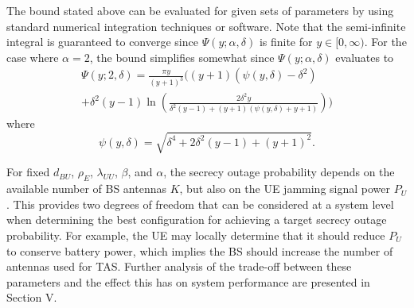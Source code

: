 \documentclass[10pt]{IEEEtran}
\begin{document}
The bound stated above can be evaluated for given sets of parameters by using standard numerical integration techniques or software.  Note that the semi-infinite integral is guaranteed to converge since $\Psi(y;\alpha,\delta)$ is finite for $y\in[0,\infty)$.  For the case where $\alpha = 2$, the bound simplifies somewhat since $\Psi(y;\alpha,\delta)$ evaluates to
\begin{multline}
  \Psi(y;2,\delta) = \frac{\pi  y }{(y+1)^3}\Bigg((y+1)(\psi(y,\delta)-\delta ^2)\\
  + \delta ^2 (y-1) \ln \left(\frac{2 \delta ^2 y}{\delta ^2 (y-1)+(y+1) (\psi(y,\delta)+y+1)}\right)\Bigg)
\end{multline}
where
\begin{equation}
  \psi(y,\delta) = \sqrt{\delta ^4+2 \delta ^2 (y-1)+(y+1)^2}.
\end{equation}
%
%

For fixed $d_{BU}$, $\rho_E$, $\lambda_{UU}$, $\beta$, and $\alpha$, the secrecy outage probability depends on the available number of BS antennas $K$, but also on the UE jamming signal power $P_U$.  This provides two degrees of freedom that can be considered at a system level when determining the best configuration for achieving a target secrecy outage probability.  For example, the UE may locally determine that it should reduce $P_U$ to conserve battery power, which implies the BS should increase the number of antennas used for TAS.  Further analysis of the trade-off between these parameters and the effect this has on system performance are presented in Section V.
\end{document}
